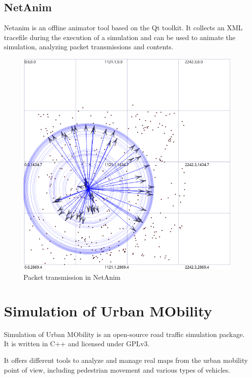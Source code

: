 		\subsection{NetAnim}
			Netanim is an offline animator tool based on the Qt toolkit. It collects an XML tracefile during the execution of a simulation and can be used to animate the simulation, analyzing packet transmissions and contents.
			
			\begin{figure}[H]
				\centering
				\includegraphics[scale=0.38]{immagini/netanim}
				\caption{Packet transmission in NetAnim}
				\label{fig:netanim}
			\end{figure}
		
	\section{Simulation of Urban MObility}
		Simulation of Urban MObility is an open-source road traffic simulation package. It is written in C++ and licensed under GPLv3. 
		
		
		It offers different tools to analyze and manage real maps from the urban mobility point of view, including pedestrian movement and various types of vehicles.
		

